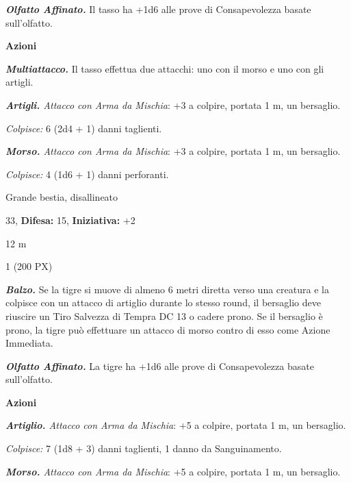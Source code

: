 \begin{multicols}{2}
{\emph{\textbf{Olfatto Affinato.}} Il tasso ha +1d6 alle prove di Consapevolezza basate sull'olfatto.

\textbf{Azioni}

\emph{\textbf{Multiattacco.}} Il tasso effettua due attacchi: uno con il morso e uno con gli artigli.

\emph{\textbf{Artigli.} Attacco con Arma da Mischia}: +3 a colpire, portata 1 m, un bersaglio.

\emph{Colpisce:} 6 (2d4 + 1) danni taglienti.

\emph{\textbf{Morso.} Attacco con Arma da Mischia}: +3 a colpire, portata 1 m, un bersaglio.

\emph{Colpisce:} 4 (1d6 + 1) danni perforanti.

\begin{description}[noitemsep, topsep=0pt, parsep=0pt, partopsep=0pt, leftmargin=0cm, labelwidth=2.2cm]
    \item[\textbf{Taglia/Tipo:}] Grande bestia, disallineato
    \item[\textbf{Caratt.:}] 
    \item[\textbf{Punti Ferita:}] 33,  \textbf{Difesa:} 15,  \textbf{Iniziativa:} +2
    \item[\textbf{Tiri Salvez.:}] 
    \item[\textbf{Movimento:}] 12 m
    \item[\textbf{Sfida:}] 1 (200 PX)\smallskip
\end{description}

\emph{\textbf{Balzo.}} Se la tigre si muove di almeno 6 metri diretta verso una creatura e la colpisce con un attacco di artiglio durante lo stesso round, il bersaglio deve riuscire un Tiro Salvezza di Tempra DC 13 o cadere prono. Se il bersaglio è prono, la tigre può effettuare un attacco di morso contro di esso come Azione Immediata.

\emph{\textbf{Olfatto Affinato.}} La tigre ha +1d6 alle prove di Consapevolezza basate sull'olfatto.

\textbf{Azioni}

\emph{\textbf{Artiglio.} Attacco con Arma da Mischia}: +5 a colpire, portata 1 m, un bersaglio.

\emph{Colpisce:} 7 (1d8 + 3) danni taglienti, 1 danno da Sanguinamento.

\emph{\textbf{Morso.} Attacco con Arma da Mischia}: +5 a colpire, portata 1 m, un bersaglio.

}
\end{multicols}
